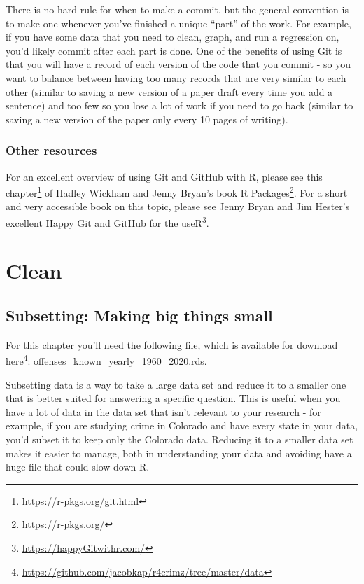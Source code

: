 \documentclass[
]{krantz}
\renewcommand{\href}[2]{#2\footnote{\url{#1}}}
\begin{document}
There is no hard rule for when to make a commit, but the
general convention is to make one whenever you've finished a
unique ``part'' of the work. For example, if you have some
data that you need to clean, graph, and run a regression on,
you'd likely commit after each part is done. One of the
benefits of using Git is that you will have a record of each
version of the code that you commit - so you want to balance
between having too many records that are very similar to
each other (similar to saving a new version of a paper draft
every time you add a sentence) and too few so you lose a lot
of work if you need to go back (similar to saving a new
version of the paper only every 10 pages of writing).

\hypertarget{other-resources}{%
\section{Other resources}\label{other-resources}}

For an excellent overview of using Git and GitHub with R,
please see \href{https://r-pkgs.org/git.html}{this chapter}
of Hadley Wickham and Jenny Bryan's book
\href{https://r-pkgs.org/}{R Packages}. For a short and very
accessible book on this topic, please see Jenny Bryan and
Jim Hester's excellent
\href{https://happyGitwithr.com/}{Happy Git and GitHub for
the useR}.

\hypertarget{part-clean}{%
\part{Clean}\label{part-clean}}

\hypertarget{subsetting-intro}{%
\chapter{Subsetting: Making big things
small}\label{subsetting-intro}}

For this chapter you'll need the following file, which is
available for download
\href{https://github.com/jacobkap/r4crimz/tree/master/data}{here}:
offenses\_known\_yearly\_1960\_2020.rds.

Subsetting data is a way to take a large data set and reduce
it to a smaller one that is better suited for answering a
specific question. This is useful when you have a lot of
data in the data set that isn't relevant to your research -
for example, if you are studying crime in Colorado and have
every state in your data, you'd subset it to keep only the
Colorado data. Reducing it to a smaller data set makes it
easier to manage, both in understanding your data and
avoiding have a huge file that could slow down R.
\end{document}
